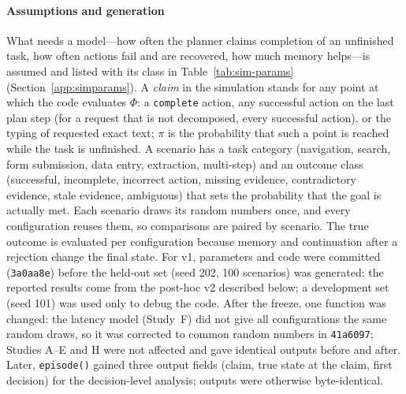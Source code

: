 \paragraph{Assumptions and generation} What needs a model---how often the planner claims completion of an unfinished task, how often actions fail and are recovered, how much memory helps---is assumed and listed with its class in Table~\ref{tab:sim-params} (Section~\ref{app:simparams}). A \emph{claim} in the simulation stands for any point at which the code evaluates $\Phi$: a \texttt{complete} action, any successful action on the last plan step (for a request that is not decomposed, every successful action), or the typing of requested exact text; $\pi$ is the probability that such a point is reached while the task is unfinished. A scenario has a task category (navigation, search, form submission, data entry, extraction, multi-step) and an outcome class (successful, incomplete, incorrect action, missing evidence, contradictory evidence, stale evidence, ambiguous) that sets the probability that the goal is actually met. Each scenario draws its random numbers once, and every configuration reuses them, so comparisons are paired by scenario. The true outcome is evaluated per configuration because memory and continuation after a rejection change the final state. For v1, parameters and code were committed (\texttt{3a0aa8e}) before the held-out set (seed 202, 100 scenarios) was generated; the reported results come from the post-hoc v2 described below; a development set (seed 101) was used only to debug the code. After the freeze, one function was changed: the latency model (Study~F) did not give all configurations the same random draws, so it was corrected to common random numbers in \texttt{41a6097}; Studies A--E and H were not affected and gave identical outputs before and after. Later, \texttt{episode()} gained three output fields (claim, true state at the claim, first decision) for the decision-level analysis; outputs were otherwise byte-identical.

